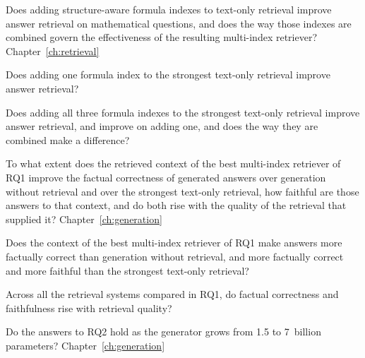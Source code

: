 \begin{description}[leftmargin=3.2em,style=nextline]
  \item[\textbf{RQ1}] Does adding structure-aware formula indexes to text-only retrieval improve
    answer retrieval on mathematical questions, and does the way those indexes are combined govern
    the effectiveness of the resulting multi-index retriever?
    \hfill Chapter~\ref{ch:retrieval}
\end{description}

\begin{description}[leftmargin=5.6em,style=nextline,topsep=0.2em]
  \item[\textbf{RQ1.1}] Does adding one formula index to the strongest text-only retrieval improve
    answer retrieval?
  \item[\textbf{RQ1.2}] Does adding all three formula indexes to the strongest text-only retrieval
    improve answer retrieval, and improve on adding one, and does the way they are combined make a
    difference?
\end{description}

\begin{description}[leftmargin=3.2em,style=nextline]
  \item[\textbf{RQ2}] To what extent does the retrieved context of the best multi-index retriever
    of RQ1 improve the factual correctness of generated answers over generation without retrieval
    and over the strongest text-only retrieval, how faithful are those answers to that context, and
    do both rise with the quality of the retrieval that supplied it?
    \hfill Chapter~\ref{ch:generation}
\end{description}

\begin{description}[leftmargin=5.6em,style=nextline,topsep=0.2em]
  \item[\textbf{RQ2.1}] Does the context of the best multi-index retriever of RQ1 make answers more
    factually correct than generation without retrieval, and more factually correct and more
    faithful than the strongest text-only retrieval?
  \item[\textbf{RQ2.2}] Across all the retrieval systems compared in RQ1, do factual correctness and
    faithfulness rise with retrieval quality?
\end{description}

\begin{description}[leftmargin=3.2em,style=nextline]
  \item[\textbf{RQ3}] Do the answers to RQ2 hold as the generator grows from 1.5 to 7~billion
    parameters?
    \hfill Chapter~\ref{ch:generation}
\end{description}

